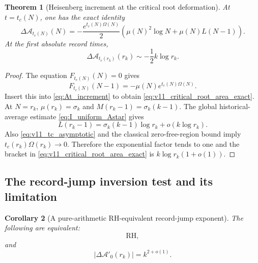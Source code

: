 \documentclass[11pt]{amsart}
\numberwithin{equation}{section}
\theoremstyle{plain}
\newtheorem{theorem}{Theorem}[section]
\newtheorem{corollary}[theorem]{Corollary}
\theoremstyle{definition}
\theoremstyle{remark}
\begin{document}
\begin{theorem}[Heisenberg increment at the critical root deformation]
\label{thm:v11_critical_root_area_increment}
At \(t=t_c(N)\), one has the exact identity
\begin{equation}
\boxed{
\Delta\mathcal A_{t_c(N)}(N)
=-\frac{e^{t_c(N)\Omega(N)}}2
\left(\mu(N)^2\log N+\mu(N)L(N-1)\right).}
\label{eq:v11_critical_root_area_exact}
\end{equation}
At the first absolute record times,
\begin{equation}
\boxed{
\Delta\mathcal A_{t_c(r_k)}(r_k)
\sim-\frac12 k\log r_k.}
\label{eq:v11_critical_root_area_record}
\end{equation}
\end{theorem}

\begin{proof}
The equation \(F_{t_c(N)}(N)=0\) gives
\begin{equation}
F_{t_c(N)}(N-1)
=-\mu(N)e^{t_c(N)\Omega(N)}.
\label{eq:v11_Ftc_previous}
\end{equation}
Insert this into \eqref{eq:At_increment} to obtain
\eqref{eq:v11_critical_root_area_exact}.  At \(N=r_k\),
\(\mu(r_k)=\sigma_k\) and
\(M(r_k-1)=\sigma_k(k-1)\).  The global historical-average estimate
\eqref{eq:I_uniform_Astar} gives
\begin{equation}
L(r_k-1)=\sigma_k(k-1)\log r_k+o(k\log r_k).
\label{eq:v11_L_record_previous}
\end{equation}
Also \eqref{eq:v11_tc_asymptotic} and the classical zero-free-region bound
imply \(t_c(r_k)\Omega(r_k)\to0\).  Therefore the exponential factor tends
to one and the bracket in \eqref{eq:v11_critical_root_area_exact} is
\(k\log r_k(1+o(1))\).
\end{proof}

\subsection{The record-jump inversion test and its limitation}
\label{subsec:v11_inversion_test}

\begin{corollary}[A pure-arithmetic RH-equivalent record-jump exponent]
\label{cor:v11_jump_RH_equivalent}
The following are equivalent:
\begin{equation}
\mathrm{RH},
\label{eq:v11_RH_item_a}
\end{equation}
and
\begin{equation}
\boxed{
|\Delta\mathcal A'_0(r_k)|=k^{2+o(1)}.}
\label{eq:v11_jump_k2}
\end{equation}
\end{corollary}
\end{document}
